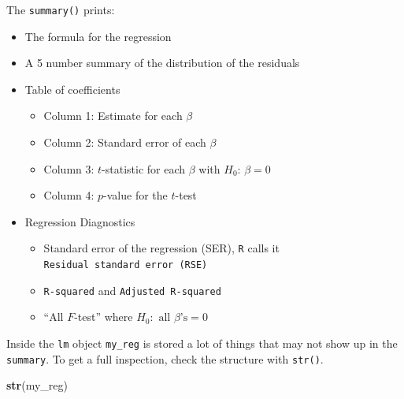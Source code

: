 \documentclass[]{book}
\newenvironment{Shaded}{\begin{snugshade}}{\end{snugshade}}
\newcommand{\KeywordTok}[1]{\textcolor[rgb]{0.13,0.29,0.53}{\textbf{#1}}}
\newcommand{\NormalTok}[1]{#1}
\providecommand{\tightlist}{%
  \setlength{\itemsep}{0pt}\setlength{\parskip}{0pt}}
\theoremstyle{definition}
\theoremstyle{definition}
\theoremstyle{definition}
\theoremstyle{remark}
\begin{document}
The \texttt{summary()} prints:

\begin{itemize}
\tightlist
\item
  The formula for the regression
\item
  A 5 number summary of the distribution of the residuals
\item
  Table of coefficients

  \begin{itemize}
  \tightlist
  \item
    Column 1: Estimate for each \(\beta\)
  \item
    Column 2: Standard error of each \(\beta\)
  \item
    Column 3: \(t\)-statistic for each \(\beta\) with
    \(H_0: \, \beta=0\)
  \item
    Column 4: \(p\)-value for the \(t\)-test
  \end{itemize}
\item
  Regression Diagnostics

  \begin{itemize}
  \tightlist
  \item
    Standard error of the regression (SER), \texttt{R} calls it
    \texttt{Residual\ standard\ error\ (RSE)}
  \item
    \texttt{R-squared} and \texttt{Adjusted\ R-squared}
  \item
    ``All \(F\)-test'' where \(H_0: \text{ all } \beta\text{'s}=0\)
  \end{itemize}
\end{itemize}

Inside the \texttt{lm} object \texttt{my\_reg} is stored a lot of things
that may not show up in the \texttt{summary}. To get a full inspection,
check the structure with \texttt{str()}.

\begin{Shaded}
\begin{Highlighting}[]
\KeywordTok{str}\NormalTok{(my_reg)}
\end{Highlighting}
\end{Shaded}
\end{document}
